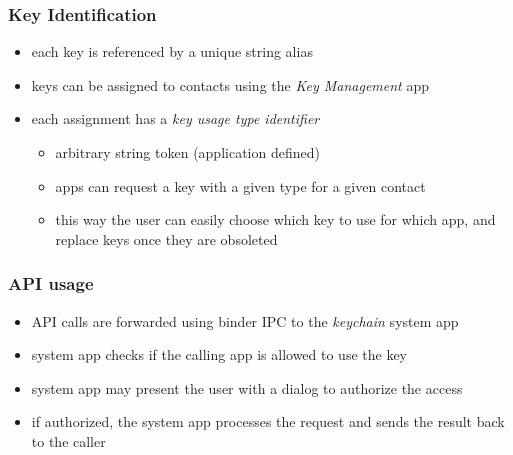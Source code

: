 \documentclass{beamer}
\begin{document}
	\begin{frame}
		\frametitle{Key Identification}
		\begin{itemize}
			\item each key is referenced by a unique string alias
			\item keys can be assigned to contacts using the {\em Key Management} app
			\item each assignment has a {\em key usage type identifier}
				\begin{itemize}
					\item arbitrary string token (application defined)
					\item apps can request a key with a given type for a given contact
					\item this way the user can easily choose which key to use for which app, and replace keys once they are obsoleted
				\end{itemize}
		\end{itemize}
	\end{frame}

	\begin{frame}
		\frametitle{API usage}
		\begin{itemize}
			\item API calls are forwarded using binder IPC to the {\em keychain} system app
			\item system app checks if the calling app is allowed to use the key
			\item system app may present the user with a dialog to authorize the access
			\item if authorized, the system app processes the request and sends the result back to the caller
		\end{itemize}
	\end{frame}
\end{document}
